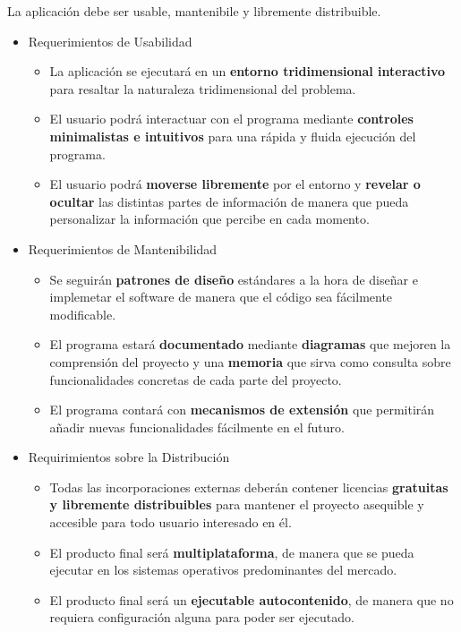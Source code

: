\documentclass[12pt,a4paper,openright,oneside]{article}
\numberwithin{equation}{section}
\theoremstyle{definition}
\begin{document}
La aplicación debe ser usable, mantenibile y libremente distribuible.
\begin{itemize}
\item Requerimientos de Usabilidad

\begin{itemize}

\item La aplicación se ejecutará en un \textbf{entorno tridimensional interactivo} para resaltar la naturaleza tridimensional del problema.

\item El usuario podrá interactuar con el programa mediante \textbf{controles minimalistas e intuitivos} para una rápida y fluida ejecución del programa.

\item El usuario podrá \textbf{moverse libremente} por el entorno y \textbf{revelar o ocultar} las distintas partes de información de manera que pueda personalizar la información que percibe en cada momento.

\end{itemize}

\item Requerimientos de Mantenibilidad

\begin{itemize}

\item Se seguirán \textbf{patrones de diseño} estándares a la hora de diseñar e implemetar el software de manera que el código sea fácilmente modificable.

\item El programa estará \textbf{documentado} mediante \textbf{diagramas} que mejoren la comprensión del proyecto y una \textbf{memoria} que sirva como consulta sobre funcionalidades concretas de cada parte del proyecto.

\item El programa contará con \textbf{mecanismos de extensión} que permitirán añadir nuevas funcionalidades fácilmente en el futuro.

\end{itemize}

\item Requirimientos sobre la Distribución

\begin{itemize}

\item Todas las incorporaciones externas deberán contener licencias \textbf{gratuitas y libremente distribuibles} para mantener el proyecto asequible y accesible para todo usuario interesado en él.

\item El producto final será \textbf{multiplataforma}, de manera que se pueda ejecutar en los sistemas operativos predominantes del mercado.

\item El producto final será un \textbf{ejecutable autocontenido}, de manera que no requiera configuración alguna para poder ser ejecutado.

\end{itemize}
\end{itemize}
\end{document}
